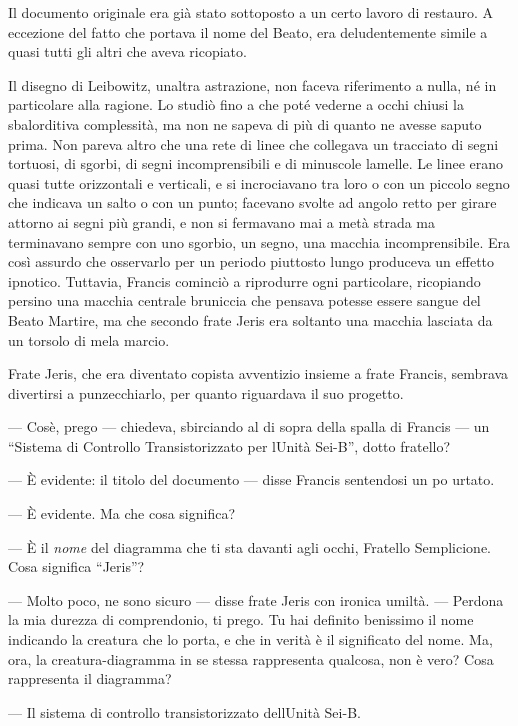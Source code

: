 Il documento originale era già stato sottoposto a un certo lavoro di
restauro. A eccezione del fatto che portava il nome del Beato, era
deludentemente simile a quasi tutti gli altri che aveva ricopiato.

Il disegno di Leibowitz, un\textquotesingle altra astrazione, non faceva
riferimento a nulla, né in particolare alla ragione. Lo studiò fino a
che poté vederne a occhi chiusi la sbalorditiva complessità, ma non ne
sapeva di più di quanto ne avesse saputo prima. Non pareva altro che una
rete di linee che collegava un tracciato di segni tortuosi, di sgorbi,
di segni incomprensibili e di minuscole lamelle. Le linee erano quasi
tutte orizzontali e verticali, e si incrociavano tra loro o con un
piccolo segno che indicava un salto o con un punto; facevano svolte ad
angolo retto per girare attorno ai segni più grandi, e non si fermavano
mai a metà strada ma terminavano sempre con uno sgorbio, un segno, una
macchia incomprensibile. Era così assurdo che osservarlo per un periodo
piuttosto lungo produceva un effetto ipnotico. Tuttavia, Francis
cominciò a riprodurre ogni particolare, ricopiando persino una macchia
centrale bruniccia che pensava potesse essere sangue del Beato Martire,
ma che secondo frate Jeris era soltanto una macchia lasciata da un
torsolo di mela marcio.

Frate Jeris, che era diventato copista avventizio insieme a frate
Francis, sembrava divertirsi a punzecchiarlo, per quanto riguardava il
suo progetto.

--- Cos\textquotesingle è, prego --- chiedeva, sbirciando al di sopra
della spalla di Francis --- un ``Sistema di Controllo Transistorizzato
per l\textquotesingle Unità Sei-B'', dotto fratello?

--- È evidente: il titolo del documento --- disse Francis sentendosi un
po\textquotesingle{} urtato.

--- È evidente. Ma che cosa significa?

--- È il \emph{nome} del diagramma che ti sta davanti agli occhi,
Fratello Semplicione. Cosa significa ``Jeris''?

--- Molto poco, ne sono sicuro --- disse frate Jeris con ironica umiltà.
--- Perdona la mia durezza di comprendonio, ti prego. Tu hai definito
benissimo il nome indicando la creatura che lo porta, e che in verità è
il significato del nome. Ma, ora, la creatura-diagramma in se stessa
rappresenta qualcosa, non è vero? Cosa rappresenta il diagramma?

--- Il sistema di controllo transistorizzato dell\textquotesingle Unità
Sei-B.

